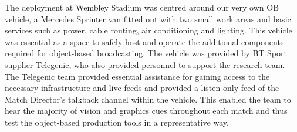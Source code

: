 \documentclass[sigchi-a, authorversion]{acmart}
\begin{document}

The deployment at Wembley Stadium was centred around our very own OB vehicle, a Mercedes Sprinter van fitted out with two small work areas and basic services such as power, cable routing, air conditioning and lighting. This vehicle was essential as a space to safely host and operate the additional components required for object-based broadcasting. The vehicle was provided by BT Sport supplier Telegenic, who also provided personnel to support the research team. The Telegenic team provided essential assistance for gaining access to the necessary infrastructure and live feeds and provided a listen-only feed of the Match Director's talkback channel within the vehicle. This enabled the team to hear the majority of vision and graphics cues throughout each match and thus test the object-based production tools in a representative way.
\end{document}

